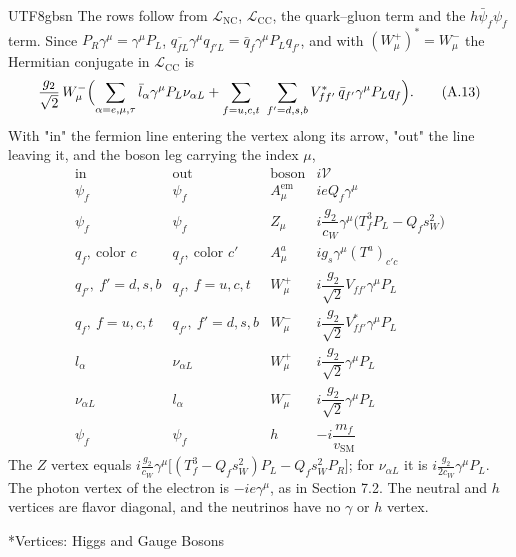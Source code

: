 \documentclass[11pt,a4paper,oneside]{report}
\makeatletter
\newcommand\topic{\@startsection{paragraph}{4}{\z@}{-1.7ex plus -.3ex}{.5ex}{\normalfont\normalsize\bfseries\itshape\boldmath}*}
\makeatother
\begin{document}
\begin{CJK*}{UTF8}{gbsn}
The rows follow from $\mathcal L_{\mathrm{NC}}$, $\mathcal L_{\mathrm{CC}}$, the quark--gluon term and the $h\bar\psi_f\psi_f$ term. Since $P_R\gamma^\mu=\gamma^\mu P_L$, $\overline{q_{fL}}\gamma^\mu q_{f'L}=\bar q_f\gamma^\mu P_Lq_{f'}$, and with $(W^+_\mu)^*=W^-_\mu$ the Hermitian conjugate in $\mathcal L_{\mathrm{CC}}$ is
\begin{equation*}
\frac{g_2}{\sqrt2}\,W^-_\mu\Bigl(\sum_{\alpha=e,\mu,\tau}\bar l_\alpha\gamma^\mu P_L\nu_{\alpha L}
+\sum_{f=u,c,t}\ \sum_{f'=d,s,b}V^*_{ff'}\,\bar q_{f'}\gamma^\mu P_Lq_f\Bigr).
\tag{A.13}\label{eq:A.13}
\end{equation*}
With "in" the fermion line entering the vertex along its arrow, "out" the line leaving it, and the boson leg carrying the index $\mu$,
\begin{equation*}
\begin{array}{lll|l}
\text{in}&\text{out}&\text{boson}&i\mathcal V\\ \hline
\psi_f&\psi_f&A^{\mathrm{em}}_\mu&ieQ_f\gamma^\mu\\[4pt]
\psi_f&\psi_f&Z_\mu&i\dfrac{g_2}{c_W}\gamma^\mu\bigl(T_f^3P_L-Q_fs_W^2\bigr)\\[10pt]
q_f,\ \text{color }c&q_f,\ \text{color }c'&A^a_\mu&ig_s\gamma^\mu(T^a)_{c'c}\\[4pt]
q_{f'},\ f'=d,s,b&q_f,\ f=u,c,t&W^+_\mu&i\dfrac{g_2}{\sqrt2}V_{ff'}\gamma^\mu P_L\\[10pt]
q_f,\ f=u,c,t&q_{f'},\ f'=d,s,b&W^-_\mu&i\dfrac{g_2}{\sqrt2}V^*_{ff'}\gamma^\mu P_L\\[10pt]
l_\alpha&\nu_{\alpha L}&W^+_\mu&i\dfrac{g_2}{\sqrt2}\gamma^\mu P_L\\[10pt]
\nu_{\alpha L}&l_\alpha&W^-_\mu&i\dfrac{g_2}{\sqrt2}\gamma^\mu P_L\\[10pt]
\psi_f&\psi_f&h&-i\dfrac{m_f}{v_{\mathrm{SM}}}
\end{array}
\tag{A.14}\label{eq:A.14}
\end{equation*}
The $Z$ vertex equals $i\frac{g_2}{c_W}\gamma^\mu\bigl[(T_f^3-Q_fs_W^2)P_L-Q_fs_W^2P_R\bigr]$; for $\nu_{\alpha L}$ it is $i\frac{g_2}{2c_W}\gamma^\mu P_L$. The photon vertex of the electron is $-ie\gamma^\mu$, as in Section 7.2. The neutral and $h$ vertices are flavor diagonal, and the neutrinos have no $\gamma$ or $h$ vertex.

\topic{Vertices: Higgs and Gauge Bosons}


\end{CJK*}
\end{document}
